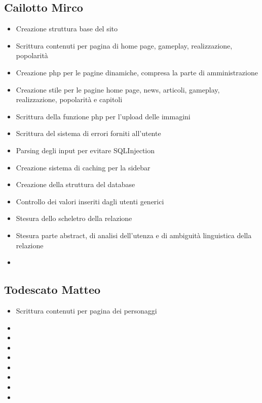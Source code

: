\documentclass[openany, a4paper, 12pt]{report}
\begin{document}
	\subsection{Cailotto Mirco}
	\begin{itemize}
		\item Creazione struttura base del sito
		\item Scrittura contenuti per pagina di home page, gameplay, realizzazione, popolarità
		\item Creazione php per le pagine dinamiche, compresa la parte di amministrazione
		\item Creazione stile per le pagine home page, news, articoli, gameplay, realizzazione, popolarità e capitoli
		\item Scrittura della funzione php per l'upload delle immagini
		\item Scrittura del sistema di errori forniti all'utente
		\item Parsing degli input per evitare SQLInjection
		\item Creazione sistema di caching per la sidebar
		\item Creazione della struttura del database
		\item Controllo dei valori inseriti dagli utenti generici
		\item Stesura dello scheletro della relazione
		\item Stesura parte abstract, di analisi dell'utenza e di ambiguità linguistica della relazione
		\item 
	\end{itemize}
	\subsection{Todescato Matteo}
	\begin{itemize}
		\item Scrittura contenuti per pagina dei personaggi 
		\item 
		\item 
		\item 
		\item 
		\item 
		\item 
		\item 
		\item 
	\end{itemize}
\end{document}

